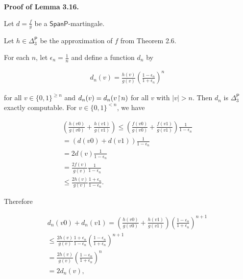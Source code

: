 \par\medskip\noindent\textbf{Proof of Lemma 3.16.}\par




Let $d=\frac{f}{g}$ be a $\mathsf{SpanP}$-martingale.

Let $h\in{\Delta^{\mathsf{P}}_{3}}$ be the approximation of $f$ from Theorem
2.6.\par




For each $n$, let $\epsilon_{n}=\frac{1}{n}$ and define a function $d_{n}$ by\par


\[\begin{gathered}
d_{n}(v)=\frac{h(v)}{g(v)}\left(\frac{1-\epsilon_{n}}{1+\epsilon_{n}}\right)^{n}
\end{gathered}\]


for all $v\in\{0,1\}^{\geq n}$ and
$d_{n}(v)=d_{n}(v\negthinspace\upharpoonright\negthinspace n)$
for all $v$ with $|v|>n$. Then $d_{n}$ is ${\Delta^{\mathsf{P}}_{3}}$ exactly computable.
For $v\in\{0,1\}^{<n}$, we have\par


\[\begin{gathered}
\displaystyle\left(\frac{h(v0)}{g(v0)}+\frac{h(v1)}{g(v1)}\right) \displaystyle\leq \displaystyle\left(\frac{f(v0)}{g(v0)}+\frac{f(v1)}{g(v1)}\right)\frac{1}{1-\epsilon_{n}} \\
\displaystyle= \displaystyle\left(d(v0)+d(v1)\right)\frac{1}{1-\epsilon_{n}} \\
\displaystyle= \displaystyle 2d(v)\frac{1}{1-\epsilon_{n}} \\
\displaystyle= \displaystyle\frac{2f(v)}{g(v)}\frac{1}{1-\epsilon_{n}} \\
\displaystyle\leq \displaystyle\frac{2h(v)}{g(v)}\frac{1+\epsilon_{n}}{1-\epsilon_{n}}.
\end{gathered}\]


Therefore\par


\[\begin{gathered}
\displaystyle d_{n}(v0)+d_{n}(v1) \displaystyle= \displaystyle\left(\frac{h(v0)}{g(v0)}+\frac{h(v1)}{g(v1)}\right)\left(\frac{1-\epsilon_{n}}{1+\epsilon_{n}}\right)^{n+1} \\
\displaystyle\leq \displaystyle\frac{2h(v)}{g(v)}\frac{1+\epsilon_{n}}{1-\epsilon_{n}}\left(\frac{1-\epsilon_{n}}{1+\epsilon_{n}}\right)^{n+1} \\
\displaystyle= \displaystyle\frac{2h(v)}{g(v)}\left(\frac{1-\epsilon_{n}}{1+\epsilon_{n}}\right)^{n} \\
\displaystyle= \displaystyle 2d_{n}(v),
\end{gathered}\]


